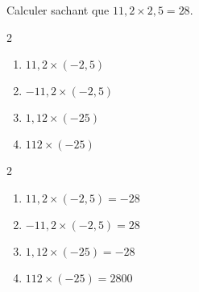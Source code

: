 \begin{exercice*}
    Calculer sachant que $11,2\times 2,5 = 28$.
    \begin{multicols}2
        \begin{enumerate}
            \item $ 11,2\times (-2,5) $
            \item $ -11,2\times (-2,5) $
            \item $ 1,12\times (-25) $
            \item $ 112\times (-25) $
        \end{enumerate}
    \end{multicols}    
\end{exercice*}
\begin{corrige}
    \phantom{rrr}    
    \begin{multicols}2
        \begin{enumerate}
            \item $ 11,2\times (-2,5) = -28 $
            \item $ -11,2\times (-2,5) = 28 $
            \item $ 1,12\times (-25) = -28 $
            \item $ 112\times (-25) = \num{2800}$
        \end{enumerate}
    \end{multicols}
\end{corrige}